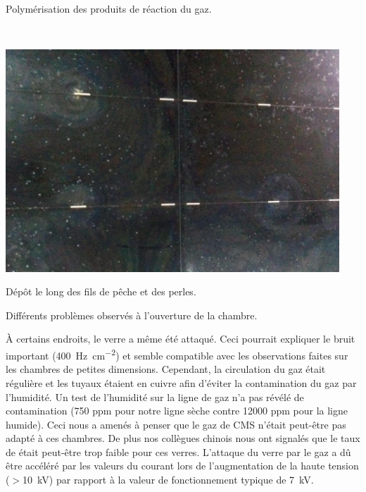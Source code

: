 \begin{minipage}[th!]{1\textwidth}
\begin{minipage}[th!]{0.48\textwidth}
\begin{minipage}[th!]{1\textwidth}
		\renewcommand\thesubfigure{(\alph{subfigure})}
		\captionsetup{type=subfigure}\caption{Polymérisation des produits de réaction du gaz.}
		\label{depot2}
	\end{minipage}%
		\\
			\begin{minipage}[th!]{1\textwidth}
			\noindent
			\centering
			\includegraphics[width=0.94\textwidth]{GLA/perle.jpg}
			\renewcommand\thesubfigure{(\alph{subfigure})}
			\captionsetup{type=subfigure}\caption{Dépôt le long des fils de pêche et des perles.}
			\label{perle}
		\end{minipage}%
	\end{minipage}%
	\addtocounter{figure}{-1}
	\captionsetup{type=figure}\caption{Différents problèmes observés à l'ouverture de la chambre.}
	\label{probs}
\end{minipage}%

 À certains endroits, le verre a même été attaqué. Ceci pourrait expliquer le bruit important (\SI{400}{\hertz\per\square\centi\meter}) et semble compatible avec les observations faites sur les chambres de petites dimensions. Cependant, la circulation du gaz était régulière et les tuyaux étaient en cuivre afin d'éviter la contamination du gaz par l'humidité. Un test de l'humidité sur la ligne de gaz n'a pas révélé de contamination (\num{750} ppm pour notre ligne sèche contre \num{12000} ppm pour la ligne humide). Ceci nous a amenés à penser que le gaz de CMS n'était peut-être pas adapté à ces chambres. De plus nos collègues chinois nous ont signalés que le taux de  était peut-être trop faible pour ces verres. L'attaque du verre par le gaz a dû être accéléré par les valeurs du courant lors de l'augmentation de la haute tension ($>$\SI{10}{\kilo\volt}) par rapport à la valeur de fonctionnement typique de \SI{7}{\kilo\volt}.
 
